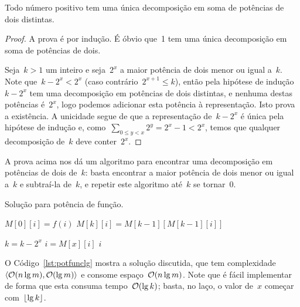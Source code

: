 \documentclass[main.tex]{subfiles}
\begin{document}
\begin{theorem} \label{thm:pot2}
	Todo número positivo tem uma única decomposição em soma de potências de dois distintas.
\end{theorem}
\begin{proof}
	A prova é por indução. É óbvio que~1 tem uma única decomposição em soma de potências de dois.

	Seja~$k > 1$ um inteiro e seja~$2^x$ a maior potência de dois menor ou igual a~$k$. Note que~$k - 2^x < 2^x$ (caso contrário~$2^{x+1} \leq k$), então pela hipótese de indução~$k - 2^x$ tem uma decomposição em potências de dois distintas, e nenhuma destas potências é~$2^x$, logo podemos adicionar esta potência à representação. Isto prova a existência. A unicidade segue de que a representação de~$k - 2^x$ é única pela hipótese de indução e, como~$\sum\limits_{0 \leq y < x}{2^{y}} = 2^x - 1 < 2^x$, temos que qualquer decomposição de~$k$ deve conter~$2^x$.
\end{proof}

A prova acima nos dá um algoritmo para encontrar uma decomposição em potências de dois de~$k$: basta encontrar a maior potência de dois menor ou igual a~$k$ e subtraí-la de~$k$, e repetir este algoritmo até~$k$ se tornar~0.

\begin{algorithm}
	\caption{Solução para potência de função.} \label{lst:potfunclg}
\begin{algorithmic}[1]
			\State $M[0][i] = f(i)$
		\EndFor
				\State $M[k][i] = M[k - 1][M[k - 1][i]]$
			\EndFor
		\EndFor
	\EndFunction

	 
				\State $k = k - 2^x$
				\State $i = M[x][i]$
			\EndIf
		\EndFor
		\State \Return $i$
	\EndFunction
\end{algorithmic}
\end{algorithm}

O Código~\ref{lst:potfunclg} mostra a solução discutida, que tem complexidade~$\langle\mathcal{O}(n\lg m), \mathcal{O}(\lg m)\rangle$ e consome espaço~$\mathcal{O}(n \lg m)$. Note que é fácil implementar~ de forma que esta consuma tempo~$\mathcal{O}(\lg k)$; basta, no laço, o valor de~$x$ começar com~$\lfloor\lg k\rfloor$.
\end{document}
